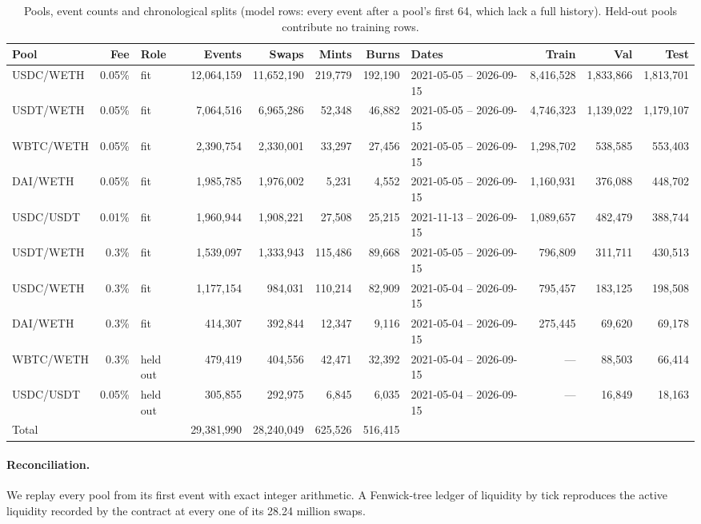 \documentclass[11pt]{article}
\begin{document}
\begin{table}[t]
\centering
\caption{Pools, event counts and chronological splits (model rows: every event after a pool's first 64, which lack a full history). Held-out pools contribute no training rows.}\label{tab:1}
\begin{adjustbox}{max width=\linewidth}
\begin{tabular}{lrlrrrrlrrr}
\toprule
Pool & Fee & Role & Events & Swaps & Mints & Burns & Dates & Train & Val & Test \\
\midrule
USDC/WETH & 0.05\% & fit & 12,064,159 & 11,652,190 & 219,779 & 192,190 & 2021-05-05 -- 2026-09-15 & 8,416,528 & 1,833,866 & 1,813,701 \\
USDT/WETH & 0.05\% & fit & 7,064,516 & 6,965,286 & 52,348 & 46,882 & 2021-05-05 -- 2026-09-15 & 4,746,323 & 1,139,022 & 1,179,107 \\
WBTC/WETH & 0.05\% & fit & 2,390,754 & 2,330,001 & 33,297 & 27,456 & 2021-05-05 -- 2026-09-15 & 1,298,702 & 538,585 & 553,403 \\
DAI/WETH & 0.05\% & fit & 1,985,785 & 1,976,002 & 5,231 & 4,552 & 2021-05-05 -- 2026-09-15 & 1,160,931 & 376,088 & 448,702 \\
USDC/USDT & 0.01\% & fit & 1,960,944 & 1,908,221 & 27,508 & 25,215 & 2021-11-13 -- 2026-09-15 & 1,089,657 & 482,479 & 388,744 \\
USDT/WETH & 0.3\% & fit & 1,539,097 & 1,333,943 & 115,486 & 89,668 & 2021-05-05 -- 2026-09-15 & 796,809 & 311,711 & 430,513 \\
USDC/WETH & 0.3\% & fit & 1,177,154 & 984,031 & 110,214 & 82,909 & 2021-05-04 -- 2026-09-15 & 795,457 & 183,125 & 198,508 \\
DAI/WETH & 0.3\% & fit & 414,307 & 392,844 & 12,347 & 9,116 & 2021-05-04 -- 2026-09-15 & 275,445 & 69,620 & 69,178 \\
WBTC/WETH & 0.3\% & held out & 479,419 & 404,556 & 42,471 & 32,392 & 2021-05-04 -- 2026-09-15 & --- & 88,503 & 66,414 \\
USDC/USDT & 0.05\% & held out & 305,855 & 292,975 & 6,845 & 6,035 & 2021-05-04 -- 2026-09-15 & --- & 16,849 & 18,163 \\
Total &  &  & 29,381,990 & 28,240,049 & 625,526 & 516,415 &  &  &  &  \\
\bottomrule
\end{tabular}
\end{adjustbox}
\end{table}

\paragraph{Reconciliation.} We replay every pool from its first event with exact integer arithmetic. A Fenwick-tree ledger of liquidity by tick reproduces the active liquidity recorded by the contract at every one of its 28.24 million swaps.
\end{document}
